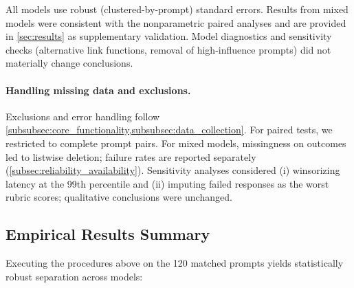 All models use robust (clustered-by-prompt) standard errors. Results from mixed models were consistent with the nonparametric paired analyses and are provided in \cref{sec:results} as supplementary validation. Model diagnostics and sensitivity checks (alternative link functions, removal of high-influence prompts) did not materially change conclusions.

\paragraph{Handling missing data and exclusions.} Exclusions and error handling follow \cref{subsubsec:core_functionality,subsubsec:data_collection}. For paired tests, we restricted to complete prompt pairs. For mixed models, missingness on outcomes led to listwise deletion; failure rates are reported separately (\cref{subsec:reliability_availability}). Sensitivity analyses considered (i) winsorizing latency at the 99th percentile and (ii) imputing failed responses as the worst rubric scores; qualitative conclusions were unchanged.

\subsection{Empirical Results Summary}\label{subsec:statistical_results}

Executing the procedures above on the 120 matched prompts yields statistically robust separation across models:

